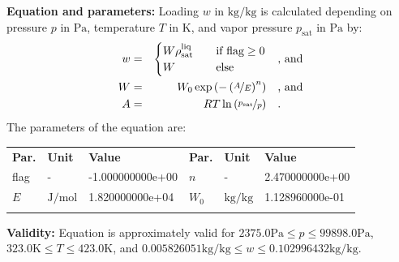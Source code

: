 \textbf{Equation and parameters:}
\newline
%
Loading $w$ in $\si{\kilogram\per\kilogram}$ is calculated depending on pressure $p$ in $\si{\pascal}$, temperature $T$ in $\si{\kelvin}$, and vapor pressure $p_\mathrm{sat}$ in $\si{\pascal}$ by:
%
\begin{equation*}
\begin{split}
w &=& \begin{cases} W \rho_\mathrm{sat}^{\mathrm{liq}} & \quad \text{if flag} \geq 0 \\ W & \quad \text{else} \end{cases} & \quad\text{, and} \\
W &=& W_0 \exp \left( - \left( \nicefrac{A}{E} \right) ^{n} \right) & \quad\text{, and} \\
A &=& R T \ln \left( \nicefrac{p_\mathrm{sat}}{p} \right) & \quad\text{.} \\
\end{split}
\end{equation*}
%
The parameters of the equation are:
%
\begin{longtable}[l]{lll|lll}
\toprule
\addlinespace
\textbf{Par.} & \textbf{Unit} & \textbf{Value} &	\textbf{Par.} & \textbf{Unit} & \textbf{Value} \\
\addlinespace
\midrule
\endhead

\bottomrule
\endfoot
\bottomrule
\endlastfoot
\addlinespace

flag & - & -1.000000000e+00 & $n$ & - & 2.470000000e+00 \\
$E$ & $\si{\joule\per\mole}$ & 1.820000000e+04 & $W_0$ & $\si{\kilogram\per\kilogram}$ & 1.128960000e-01 \\

\addlinespace\end{longtable}

\textbf{Validity:}
\newline
Equation is approximately valid for $2375.0 \si{\pascal} \leq p \leq 99898.0 \si{\pascal}$,  $323.0 \si{\kelvin} \leq T \leq 423.0 \si{\kelvin}$, and $0.005826051 \si{\kilogram\per\kilogram} \leq w \leq 0.102996432 \si{\kilogram\per\kilogram}$.
\newline

